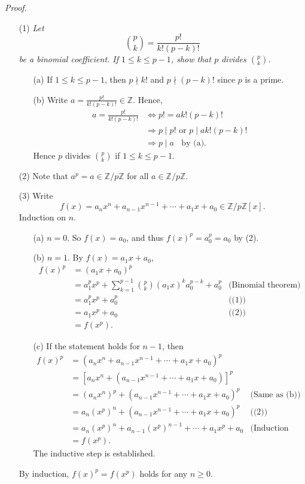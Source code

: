 \documentclass{article}
\begin{document}
\emph{Proof.}
\begin{enumerate}
\item[(1)]
\emph{Let $${p \choose k} = \frac{p!}{k!(p-k)!}$$
be a binomial coefficient.
If $1 \leq k \leq p-1$, show that $p$ divides ${p \choose k}$.}
  \begin{enumerate}
  \item[(a)]
    If $1 \leq k \leq p-1$, then $p \nmid k!$ and $p \nmid (p-k)!$
    since $p$ is a prime.
  \item[(b)]
    Write $a = \frac{p!}{k!(p-k)!} \in \mathbb{Z}$.
    Hence,
    \begin{align*}
    a = \frac{p!}{k!(p-k)!}
    &\Longleftrightarrow
    p! = ak!(p-k)! \\
    &\Longrightarrow
    p \mid p! \text{ or } p \mid ak!(p-k)! \\
    &\Longrightarrow
    p \mid a \:\:\:\: \text{by (a).}
    \end{align*}
    Hence $p$ divides ${p \choose k}$ if $1 \leq k \leq p-1$.
  \end{enumerate}
\item[(2)]
Note that $a^p = a \in \mathbb{Z}/p\mathbb{Z}$ for all $a \in \mathbb{Z}/p\mathbb{Z}$.
\item[(3)]
Write
$$f(x) = a_n x^n + a_{n-1} x^{n-1} + \cdots + a_1 x + a_0 \in \mathbb{Z}/p\mathbb{Z}[x].$$
Induction on $n$.
  \begin{enumerate}
  \item[(a)]
    $n = 0$. So $f(x) = a_0$, and thus $f(x)^p = a_0^p = a_0$ by (2).
  \item[(b)]
    $n = 1$. By $f(x) = a_1 x + a_0$,
    \begin{align*}
    f(x)^p
    &= (a_1 x + a_0)^p \\
    &= a_1^p x^p
      + \sum_{k=1}^{p-1} {p \choose k} (a_1 x)^k a_0^{p-k}
      + a_0^p
      &\text{(Binomial theorem)} \\
    &= a_1^p x^p + a_0^p
      &\text{((1))} \\
    &= a_1 x^p + a_0
      &\text{((2))} \\
    &= f(x^p).
    \end{align*}
  \item[(c)]
  If the statement holds for $n-1$, then
    \begin{align*}
    f(x)^p
    &= (a_n x^n + a_{n-1} x^{n-1} + \cdots + a_1 x + a_0)^p \\
    &= [a_n x^n + (a_{n-1} x^{n-1} + \cdots + a_1 x + a_0)]^p \\
    &= (a_n x^n)^p + (a_{n-1} x^{n-1} + \cdots + a_1 x + a_0)^p
      &\text{(Same as (b))} \\
    &= a_n (x^p)^n+ (a_{n-1} x^{n-1} + \cdots + a_1 x + a_0)^p
      &\text{((2))} \\
    &= a_n (x^p)^n + a_{n-1} (x^p)^{n-1} + \cdots + a_1 x^p + a_0
      &\text{(Induction hypothesis)} \\
    &= f(x^p).
    \end{align*}
  The inductive step is established.
  \end{enumerate}
  By induction, $f(x)^p = f(x^p)$ holds for any $n \geq 0$.
\end{enumerate}
\end{document}
